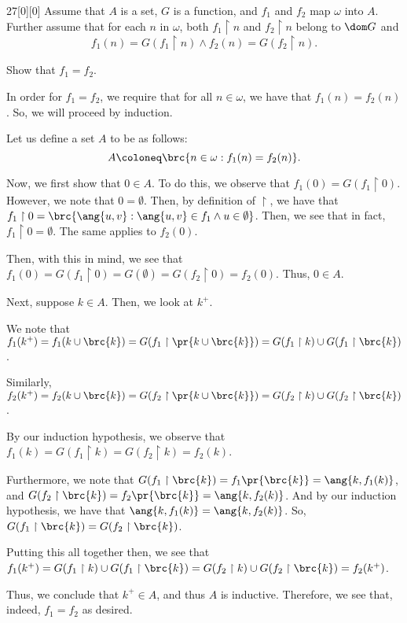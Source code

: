 \documentclass{article}
\begin{document}
\begin{hw}{27}[0][0]
	Assume that $A$ is a set, $G$ is a function, and $f_{1}$ and $f_{2}$ map $\omega$ into $A$. Further assume that for each $n$ in $\omega$, both $f_{1} \restriction n$ and $f_{2} \restriction n$ belong to $\dom G$ and
	\begin{equation*}
		f_{1}(n) = G(f_{1} \restriction n) \land f_{2}(n) = G(f_{2} \restriction n).
	\end{equation*}

	Show that $f_{1} = f_{2}$.
\end{hw}
\begin{solution}
	In order for $f_{1} = f_{2}$, we require that for all $n \in \omega$, we have that $f_{1}(n) = f_{2}(n)$. So, we will proceed by induction.
	
	Let us define a set $A$ to be as follows:
	\begin{equation*}
		A \coloneq \brc{n \in \omega : f_{1}(n) = f_{2}(n)}.
	\end{equation*}

	Now, we first show that $0 \in A$. To do this, we observe that $f_{1}(0) = G(f_{1} \restriction 0)$. However, we note that $0 = \emptyset$. Then, by definition of $\restriction$, we have that $f_{1} \restriction 0 = \brc{\ang{u,v} : \ang{u,v} \in f_{1} \land u \in \emptyset}$. Then, we see that in fact, $f_{1} \restriction 0 = \emptyset$. The same applies to $f_{2}(0)$.
	
	Then, with this in mind, we see that $f_{1}(0) = G(f_{1} \restriction 0) = G(\emptyset) = G(f_{2} \restriction 0) = f_{2}(0)$. Thus, $0 \in A$.
	
	Next, suppose $k \in A$. Then, we look at $k^{+}$.
	
	We note that $f_{1}(k^{+}) = f_{1}(k \cup \brc{k}) = G(f_{1} \restriction \pr{k \cup \brc{k}}) = G(f_{1} \restriction k) \cup G(f_{1} \restriction \brc{k})$.
	
	Similarly, $f_{2}(k^{+}) = f_{2}(k \cup \brc{k}) = G(f_{2} \restriction \pr{k \cup \brc{k}}) = G(f_{2} \restriction k) \cup G(f_{2} \restriction \brc{k})$.
	
	By our induction hypothesis, we observe that $f_{1}(k) = G(f_{1} \restriction k) = G(f_{2} \restriction k) = f_{2}(k)$.
	
	Furthermore, we note that $G(f_{1} \restriction \brc{k}) = f_{1}\pr{ \brc{k} } = \ang{k, f_{1}(k)}$, and $G(f_{2} \restriction \brc{k}) = f_{2}\pr{ \brc{k} } = \ang{k, f_{2}(k)}$. And by our induction hypothesis, we have that $\ang{k, f_{1}(k)} = \ang{k, f_{2}(k)}$. So, $G(f_{1} \restriction \brc{k}) = G(f_{2} \restriction \brc{k})$.
	
	Putting this all together then, we see that $f_{1}(k^{+}) = G(f_{1} \restriction k) \cup G(f_{1} \restriction \brc{k}) = G(f_{2} \restriction k) \cup G(f_{2} \restriction \brc{k}) = f_{2}(k^{+})$.
	
	Thus, we conclude that $k^{+} \in A$, and thus $A$ is inductive. Therefore, we see that, indeed, $f_{1} = f_{2}$ as desired.
\end{solution}
\end{document}
